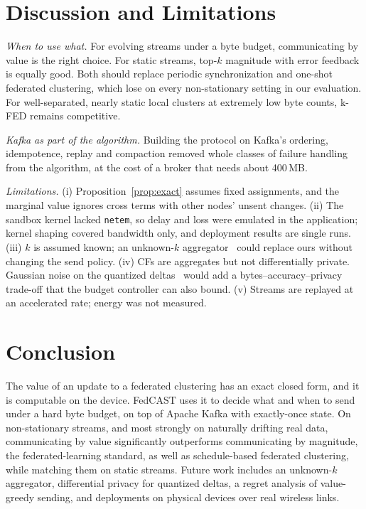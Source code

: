 \documentclass[journal]{IEEEtran}
\begin{document}
\section{Discussion and Limitations}\label{sec:discussion}
\textit{When to use what.} For evolving streams under a byte budget, communicating by value is the right choice. For static streams, top-$k$ magnitude with error feedback is equally good. Both should replace periodic synchronization and one-shot federated clustering, which lose on every non-stationary setting in our evaluation. For well-separated, nearly static local clusters at extremely low byte counts, k-FED remains competitive.

\textit{Kafka as part of the algorithm.} Building the protocol on Kafka's ordering, idempotence, replay and compaction removed whole classes of failure handling from the algorithm, at the cost of a broker that needs about 400\,MB.

\textit{Limitations.} (i) Proposition~\ref{prop:exact} assumes fixed assignments, and the marginal value ignores cross terms with other nodes' unsent changes. (ii) The sandbox kernel lacked \texttt{netem}, so delay and loss were emulated in the application; kernel shaping covered bandwidth only, and deployment results are single runs. (iii) $k$ is assumed known; an unknown-$k$ aggregator~\cite{zhang2025afcl} could replace ours without changing the send policy. (iv) CFs are aggregates but not differentially private. Gaussian noise on the quantized deltas~\cite{epasto2023dpstream} would add a bytes--accuracy--privacy trade-off that the budget controller can also bound. (v) Streams are replayed at an accelerated rate; energy was not measured.

\section{Conclusion}
The value of an update to a federated clustering has an exact closed form, and it is computable on the device. FedCAST uses it to decide what and when to send under a hard byte budget, on top of Apache Kafka with exactly-once state. On non-stationary streams, and most strongly on naturally drifting real data, communicating by value significantly outperforms communicating by magnitude, the federated-learning standard, as well as schedule-based federated clustering, while matching them on static streams. Future work includes an unknown-$k$ aggregator, differential privacy for quantized deltas, a regret analysis of value-greedy sending, and deployments on physical devices over real wireless links.



\end{document}

